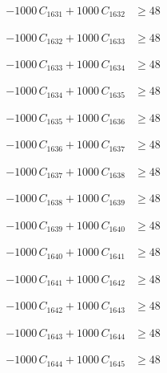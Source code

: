 \documentclass[a4paper,11pt]{article}
\begin{document}
\begin{align}
-1000\,C_{1631} + 1000\,C_{1632} &\geq 48 \nonumber
\end{align}

\begin{align}
-1000\,C_{1632} + 1000\,C_{1633} &\geq 48 \nonumber
\end{align}

\begin{align}
-1000\,C_{1633} + 1000\,C_{1634} &\geq 48 \nonumber
\end{align}

\begin{align}
-1000\,C_{1634} + 1000\,C_{1635} &\geq 48 \nonumber
\end{align}

\begin{align}
-1000\,C_{1635} + 1000\,C_{1636} &\geq 48 \nonumber
\end{align}

\begin{align}
-1000\,C_{1636} + 1000\,C_{1637} &\geq 48 \nonumber
\end{align}

\begin{align}
-1000\,C_{1637} + 1000\,C_{1638} &\geq 48 \nonumber
\end{align}

\begin{align}
-1000\,C_{1638} + 1000\,C_{1639} &\geq 48 \nonumber
\end{align}

\begin{align}
-1000\,C_{1639} + 1000\,C_{1640} &\geq 48 \nonumber
\end{align}

\begin{align}
-1000\,C_{1640} + 1000\,C_{1641} &\geq 48 \nonumber
\end{align}

\begin{align}
-1000\,C_{1641} + 1000\,C_{1642} &\geq 48 \nonumber
\end{align}

\begin{align}
-1000\,C_{1642} + 1000\,C_{1643} &\geq 48 \nonumber
\end{align}

\begin{align}
-1000\,C_{1643} + 1000\,C_{1644} &\geq 48 \nonumber
\end{align}

\begin{align}
-1000\,C_{1644} + 1000\,C_{1645} &\geq 48 \nonumber
\end{align}
\end{document}
